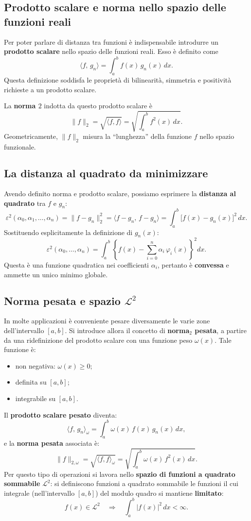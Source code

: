 \documentclass[a4paper,12pt]{article}
\theoremstyle{definition}
\theoremstyle{remark}
\begin{document}
\subsection{Prodotto scalare e norma nello spazio delle funzioni reali}

Per poter parlare di distanza tra funzioni è indispensabile introdurre
un \textbf{prodotto scalare} nello spazio delle funzioni reali. Esso è
definito come
\[
  \langle f,\, g_n \rangle = \int_a^b f(x)\,g_n(x)\,dx.
\]
Questa definizione soddisfa le proprietà di bilinearità, simmetria e
positività richieste a un prodotto scalare.

La \textbf{norma $2$} indotta da questo prodotto scalare è
\[
  \|f\|_2 = \sqrt{\langle f,f \rangle} = \sqrt{\int_a^b f^2(x)\,dx}.
\]
Geometricamente, $\|f\|_2$ misura la ``lunghezza'' della funzione $f$
nello spazio funzionale.

\subsection{La distanza al quadrato da minimizzare}

Avendo definito norma e prodotto scalare, possiamo esprimere la
\textbf{distanza al quadrato} tra $f$ e $g_n$:
\[
  \varepsilon^2(\alpha_0,\alpha_1,\ldots,\alpha_n)
  = \|f - g_n\|_2^2
  = \langle f - g_n,\, f - g_n \rangle
  = \int_a^b \bigl[f(x) - g_n(x)\bigr]^2\,dx.
\]
Sostituendo esplicitamente la definizione di $g_n(x)$:
\[
  \varepsilon^2(\alpha_0,\ldots,\alpha_n)
  = \int_a^b \left\{f(x) - \sum_{i=0}^{n}\alpha_i\,\varphi_i(x)\right\}^2 dx.
\]
Questa è una funzione quadratica nei coefficienti $\alpha_i$, pertanto
è \textbf{convessa} e ammette un unico minimo globale.

\subsection{Norma pesata e spazio $\mathcal{L}^2$}

In molte applicazioni è conveniente pesare diversamente le varie zone
dell'intervallo $[a,b]$. Si introduce allora il concetto di
\textbf{norma$_2$ pesata}, a partire da una ridefinizione del prodotto
scalare con una funzione peso $\omega(x)$. Tale funzione è:
\begin{itemize}
  \item non negativa: $\omega(x) \geq 0$;
  \item definita su $[a,b]$;
  \item integrabile su $[a,b]$.
\end{itemize}
Il \textbf{prodotto scalare pesato} diventa:
\[
  \langle f,\, g_n \rangle_\omega = \int_a^b \omega(x)\,f(x)\,g_n(x)\,dx,
\]
e la \textbf{norma pesata} associata è:
\[
  \|f\|_{2,\omega} = \sqrt{\langle f,f \rangle_\omega}
  = \sqrt{\int_a^b \omega(x)\,f^2(x)\,dx}.
\]
Per questo tipo di operazioni si lavora nello \textbf{spazio di funzioni
a quadrato sommabile} $\mathcal{L}^2$: si definiscono funzioni a quadrato
sommabile le funzioni il cui integrale (nell'intervallo $[a,b]$) del
modulo quadro si mantiene \textbf{limitato}:
\[
  f(x) \in \mathcal{L}^2 \quad\Longrightarrow\quad
  \int_a^b |f(x)|^2\,dx < \infty.
\]
\end{document}
